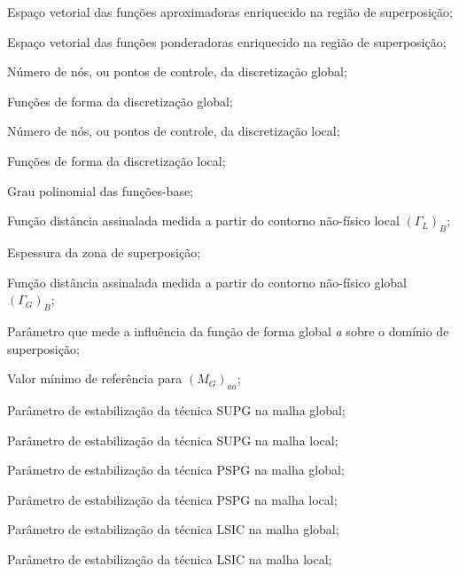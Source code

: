 \begin{simbolos}
   \item[$\mathcal{S}_{enr}$] Espaço vetorial das funções aproximadoras enriquecido na região de superposição;
   \item[$\mathcal{V}_{enr}$] Espaço vetorial das funções ponderadoras enriquecido na região de superposição;
   \item[$(n_{np})_G$] Número de nós, ou pontos de controle, da discretização global;
   \item[$N_G$] Funções de forma da discretização global;
   \item[$(n_{np})_L$] Número de nós, ou pontos de controle, da discretização local;
   \item[$N_L$] Funções de forma da discretização local;
   \item[$p$] Grau polinomial das funções-base;
   \item[$Y_{L}$] Função distância assinalada medida a partir do contorno não-físico local $(\Gamma_{L})_B$;
   \item[$\delta$] Espessura da zona de superposição;
   \item[$Y_{G}$] Função distância assinalada medida a partir do contorno não-físico global $(\Gamma_{G})_B$;
   \item[$(M_{G})_{aa}$] Parâmetro que mede a influência da função de forma global \textit{a} sobre o domínio de superposição;
   \item[$M_{min}$] Valor mínimo de referência para $(M_{G})_{aa}$;
   \item[$(\SUPG)^{G}$] Parâmetro de estabilização da técnica SUPG na malha global;
   \item[$(\SUPG)^{L}$] Parâmetro de estabilização da técnica SUPG na malha local;
   \item[$(\PSPG)^{G}$] Parâmetro de estabilização da técnica PSPG na malha global;
   \item[$(\PSPG)^{L}$] Parâmetro de estabilização da técnica PSPG na malha local;
   \item[$(\LSIC)^{G}$] Parâmetro de estabilização da técnica LSIC na malha global;
   \item[$(\LSIC)^{L}$] Parâmetro de estabilização da técnica LSIC na malha local;
   

\end{simbolos}
